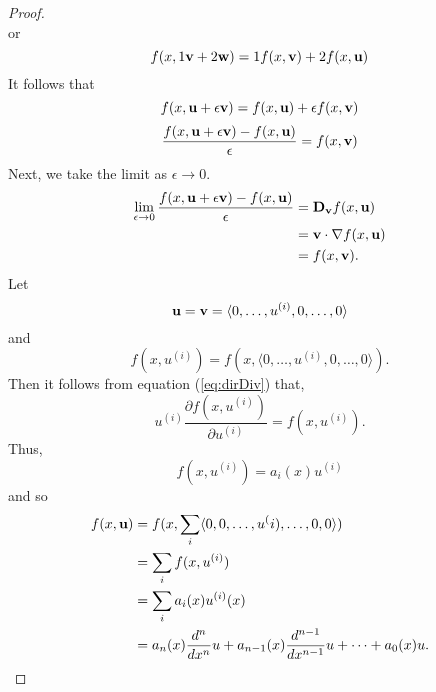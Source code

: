 \begin{proof}
\begin{equation*}
	\end{equation*}
	or
	\begin{equation*}
		f(x,1 \textbf{v} + 2 \textbf{w})= 1 f(x, \textbf{v}) + 2 f(x, \textbf{u})
	\end{equation*}
	It follows that 
	\begin{equation*}
		f(x, \textbf{u} + \epsilon \textbf{v}) = f(x, \textbf{u}) + \epsilon f(x, \textbf{v})
	\end{equation*}
	\begin{equation*}
		\frac{f(x, \textbf{u} + \epsilon \textbf{v})-f(x,\textbf{u})}{\epsilon} = f(x,\textbf{v})
	\end{equation*}
	Next, we take the limit as \(\epsilon \to 0\). 
	\begin{equation}\label{eq:dirDiv}
		\begin{split}
			\lim_{\epsilon \to 0}\frac{f(x, \textbf{u} + \epsilon \textbf{v} )-f(x,\textbf{u} )}{\epsilon} &= \mathrm{\bf{D}}_{\textbf{v}} f(x,\textbf{u})\\
			&= \textbf{v} \cdot \nabla f(x,\textbf{u})\\
			&= f(x,\textbf{v}).
		\end{split}
	\end{equation}
	Let 
	\begin{equation*}
		\textbf{u} = \textbf{v} = \langle 0, \dots, u^{(i)}, 0, \dots, 0 \rangle
	\end{equation*}
	and
	\begin{equation*}
		f(x,u^{(i)}) = f(x, \langle 0, \dots, u^{(i)}, 0, \dots, 0 \rangle ).
	\end{equation*}
	Then it follows from equation (\ref{eq:dirDiv}) that,
	\begin{equation*}
		u^{(i)}\frac{\partial f(x, u^{(i)})}{\partial u^{(i)}} = f(x,u^{(i)}).
	\end{equation*}
	Thus, 
	\begin{equation*}
		f(x,u^{(i)}) = a_i(x)u^{(i)}
	\end{equation*} 
	and so 
	\begin{equation*}
		\begin{split}
			f(x,\textbf{u}) &= f(x, \sum_i \langle 0, 0, \dots, u^(i), \dots, 0, 0 \rangle)\\
			&=\sum_i f(x,u^{(i)}) \\
			&= \sum_i a_i(x)u^{(i)}(x)\\
			&= a_n(x) \frac{d^n}{dx^n}u + a_{n-1}(x) \frac{d^{n-1}}{dx^{n-1}}u + \cdots + a_0(x)u.
		\end{split}
	\end{equation*}
\end{proof}

